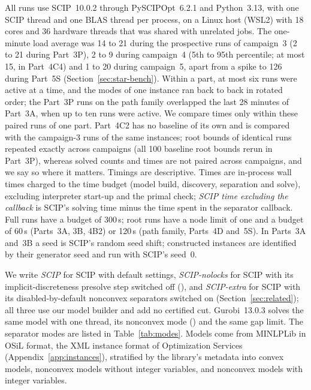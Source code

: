 All runs use SCIP~10.0.2 through PySCIPOpt~6.2.1 and Python~3.13, with one
SCIP thread and one BLAS thread per process, on a Linux host (WSL2) with 18
cores and 36 hardware threads that was shared with unrelated jobs. The
one-minute load average was 14 to 21 during the prospective runs of
campaign~3 (2 to 21 during Part~3P), 2 to 9 during campaign~4 (5th to 95th
percentile; at most 15, in Part~4C4) and 1 to 20 during campaign~5, apart from
a spike to 126 during Part~5S (Section~\ref{sec:star-bench}). Within a
part, at most six runs were active at a time, and the modes of one instance
ran back to back in rotated order; the Part~3P runs on the path family
overlapped the last 28 minutes of Part~3A, when up to ten runs were active. We
compare times only within these paired runs of one part. Part~4C2 has no
baseline of its own and is compared with the campaign-3 runs of the same
instances; root bounds of identical runs repeated exactly across campaigns
(all 100 baseline root bounds rerun in Part~3P), whereas solved counts and
times are not paired across campaigns, and we say so where it matters. Timings
are descriptive. Times are in-process wall times charged to the time budget
(model build, discovery, separation and solve), excluding interpreter start-up
and the primal check; \emph{SCIP time excluding the callback} is SCIP's solving
time minus the time spent in the separator callback. Full runs have a budget of
300\,s; root runs have a node limit of one and a budget of 60\,s (Parts~3A, 3B,
4B2) or 120\,s (path family, Parts~4D and~5S). In Parts~3A and~3B a seed is
SCIP's random seed shift; constructed instances are identified by their
generator seed and run with SCIP's seed~0.

We write \emph{SCIP} for SCIP with default settings, \emph{SCIP-nolocks} for SCIP
with its implicit-discreteness presolve step switched off
(), and \emph{SCIP-extra} for SCIP
with its disabled-by-default nonconvex separators switched on
(Section~\ref{sec:related}); all three use our model builder and add no
certified cut. Gurobi~13.0.3 \citep{Gurobi13} solves the same model with one
thread, its nonconvex mode () and the same gap limit. The
separator modes are listed in Table~\ref{tab:modes}. Models come from MINLPLib
\citep{BussieckDrudMeeraus2003,Vigerske2026MINLPLib} in OSiL format, the XML
instance format of Optimization Services (Appendix~\ref{app:instances}),
stratified by the library's metadata into convex models, nonconvex models
without integer variables, and nonconvex models with integer variables.

